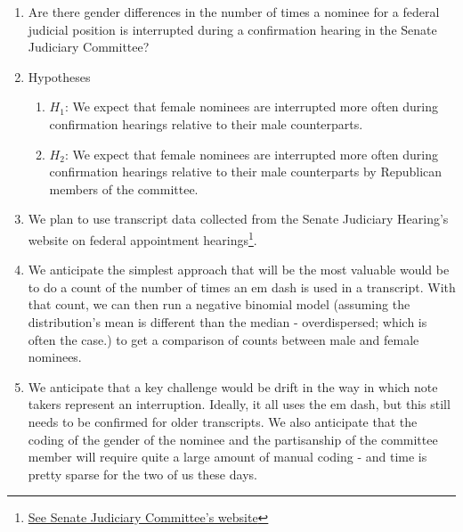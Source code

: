 \documentclass[12pt]{article}
\begin{document}

\cfoot{\thepage}

\doublespacing

\begin{enumerate}
    \item Are there gender differences in the number of times a nominee for a federal judicial position is interrupted during a confirmation hearing in the Senate Judiciary Committee?
    \item Hypotheses
    \begin{enumerate}
        \item $H_1$: We expect that female nominees are interrupted more often during confirmation hearings relative to their male counterparts. 
        \item $H_2$: We expect that female nominees are interrupted more often during confirmation hearings relative to their male counterparts by Republican members of the committee. 
    \end{enumerate}
    \item We plan to use transcript data collected from the Senate Judiciary Hearing's website on federal appointment hearings\footnote{\href{https://www.govinfo.gov/committee/senate-judiciary?path=/browsecommittee/chamber/senate/committee/judiciary/collection/CHRG/congress/107}{See Senate Judiciary Committee's website}}. 
    \item We anticipate the simplest approach that will be the most valuable would be to do a count of the number of times an em dash is used in a transcript. With that count, we can then run a negative binomial model (assuming the distribution's mean is different than the median - overdispersed; which is often the case.) to get a comparison of counts between male and female nominees.
    \item We anticipate that a key challenge would be drift in the way in which note takers represent an interruption. Ideally, it all uses the em dash, but this still needs to be confirmed for older transcripts. We also anticipate that the coding of the gender of the nominee and the partisanship of the committee member will require quite a large amount of manual coding - and time is pretty sparse for the two of us these days.  
\end{enumerate}
\newpage


\end{document}
